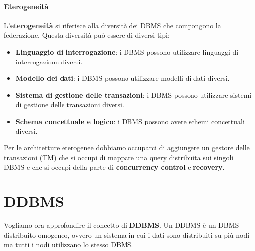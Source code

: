 \paragraph{Eterogeneità} L'\textbf{eterogeneità} si riferisce alla diversità dei DBMS
che compongono la federazione. Questa diversità può essere di diversi tipi:
\begin{itemize}
      \item \textbf{Linguaggio di interrogazione}: i DBMS possono utilizzare
            linguaggi di interrogazione diversi.
      \item \textbf{Modello dei dati}: i DBMS possono utilizzare modelli di dati
            diversi.
      \item \textbf{Sistema di gestione delle transazioni}: i DBMS possono utilizzare
            sistemi di gestione delle transazioni diversi.
      \item \textbf{Schema concettuale e logico}: i DBMS possono avere schemi
            concettuali diversi.
\end{itemize}
Per le architetture eterogenee dobbiamo occuparci di aggiungere un gestore delle
transazioni (TM) che si occupi di mappare una query distribuita sui singoli DBMS
e che si occupi della parte di \textbf{concurrency control} e \textbf{recovery}.
\section{DDBMS}
Vogliamo ora approfondire il concetto di \textbf{DDBMS}. Un DDBMS è un DBMS
distribuito omogeneo, ovvero un sistema in cui i dati sono distribuiti su più
nodi ma tutti i nodi utilizzano lo stesso DBMS.

